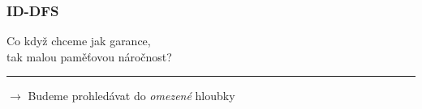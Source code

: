 \documentclass[usenames,dvipsnames,9pt]{beamer}
\begin{document}
\begin{frame}[t]

\end{frame}

\begin{frame}
  \frametitle{ID-DFS}

  \begin{center}
  	\LARGE Co když chceme jak garance, \\ tak malou paměťovou náročnost?
  \end{center}

  \vspace{2em}\hrule\vspace{2em}
  \hfill $\rightarrow$ Budeme prohledávat do \emph{omezené} hloubky
\end{frame}
\end{document}
